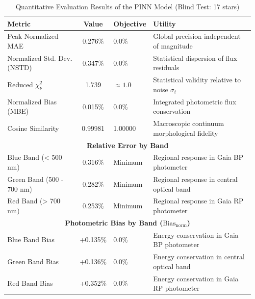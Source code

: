 
\begin{table}[htpb]
\centering
\caption{Quantitative Evaluation Results of the PINN Model (Blind Test: 17 stars)}
\label{tab:pinn_evaluation}
\begin{tabular}{lcll}
\hline
\textbf{Metric} & \textbf{Value} & \textbf{Objective} & \textbf{Utility} \\
\hline
Peak-Normalized MAE & 0.276\% & 0.0\% & Global precision independent of magnitude \\
Normalized Std. Dev. (NSTD) & 0.347\% & 0.0\% & Statistical dispersion of flux residuals \\
Reduced $\chi^2_\nu$ & 1.739 & $\approx 1.0$ & Statistical validity relative to noise $\sigma_i$ \\
Normalized Bias (MBE) & 0.015\% & 0.0\% & Integrated photometric flux conservation \\
Cosine Similarity & 0.99981 & 1.00000 & Macroscopic continuum morphological fidelity \\
\hline
\multicolumn{4}{c}{\textbf{Relative Error by Band}} \\
\hline
Blue Band (< 500 nm) & 0.316\% & Minimum & Regional response in Gaia BP photometer \\
Green Band (500 - 700 nm) & 0.282\% & Minimum & Regional response in central optical band \\
Red Band (> 700 nm) & 0.253\% & Minimum & Regional response in Gaia RP photometer \\
\hline
\multicolumn{4}{c}{\textbf{Photometric Bias by Band ($\text{Bias}_{\text{norm}}$)}} \\
\hline
Blue Band Bias & +0.135\% & 0.0\% & Energy conservation in Gaia BP photometer \\
Green Band Bias & +0.136\% & 0.0\% & Energy conservation in central optical band \\
Red Band Bias & +0.352\% & 0.0\% & Energy conservation in Gaia RP photometer \\
\hline
\end{tabular}
\end{table}
